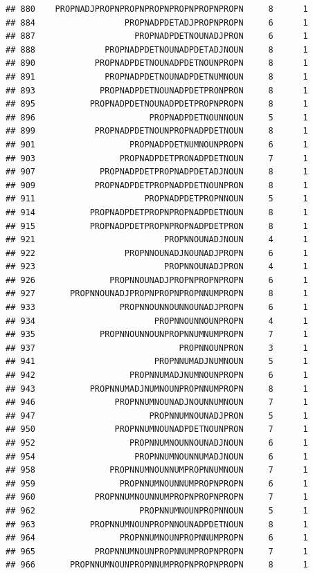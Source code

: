 \documentclass[]{article}
\begin{document}
\begin{verbatim}
## 880    PROPNADJPROPNPROPNPROPNPROPNPROPNPROPN     8      1
## 884                  PROPNADPDETADJPROPNPROPN     6      1
## 887                    PROPNADPDETNOUNADJPRON     6      1
## 888              PROPNADPDETNOUNADPDETADJNOUN     8      1
## 890            PROPNADPDETNOUNADPDETNOUNPROPN     8      1
## 891              PROPNADPDETNOUNADPDETNUMNOUN     8      1
## 893             PROPNADPDETNOUNADPDETPRONPRON     8      1
## 895           PROPNADPDETNOUNADPDETPROPNPROPN     8      1
## 896                       PROPNADPDETNOUNNOUN     5      1
## 899            PROPNADPDETNOUNPROPNADPDETNOUN     8      1
## 901                   PROPNADPDETNUMNOUNPROPN     6      1
## 903                 PROPNADPDETPRONADPDETNOUN     7      1
## 907             PROPNADPDETPROPNADPDETADJNOUN     8      1
## 909            PROPNADPDETPROPNADPDETNOUNPRON     8      1
## 911                      PROPNADPDETPROPNNOUN     5      1
## 914           PROPNADPDETPROPNPROPNADPDETNOUN     8      1
## 915           PROPNADPDETPROPNPROPNADPDETPRON     8      1
## 921                          PROPNNOUNADJNOUN     4      1
## 922                  PROPNNOUNADJNOUNADJPROPN     6      1
## 923                          PROPNNOUNADJPRON     4      1
## 926               PROPNNOUNADJPROPNPROPNPROPN     6      1
## 927       PROPNNOUNADJPROPNPROPNPROPNNUMPROPN     8      1
## 933                 PROPNNOUNNOUNNOUNADJPROPN     6      1
## 934                        PROPNNOUNNOUNPROPN     4      1
## 935             PROPNNOUNNOUNPROPNNUMNUMPROPN     7      1
## 937                             PROPNNOUNPRON     3      1
## 941                        PROPNNUMADJNUMNOUN     5      1
## 942                   PROPNNUMADJNUMNOUNPROPN     6      1
## 943           PROPNNUMADJNUMNOUNPROPNNUMPROPN     8      1
## 946                PROPNNUMNOUNADJNOUNNUMNOUN     7      1
## 947                       PROPNNUMNOUNADJPRON     5      1
## 950                PROPNNUMNOUNADPDETNOUNPRON     7      1
## 952                   PROPNNUMNOUNNOUNADJNOUN     6      1
## 954                    PROPNNUMNOUNNUMADJNOUN     6      1
## 958               PROPNNUMNOUNNUMPROPNNUMNOUN     7      1
## 959                 PROPNNUMNOUNNUMPROPNPROPN     6      1
## 960            PROPNNUMNOUNNUMPROPNPROPNPROPN     7      1
## 962                     PROPNNUMNOUNPROPNNOUN     5      1
## 963           PROPNNUMNOUNPROPNNOUNADPDETNOUN     8      1
## 964                 PROPNNUMNOUNPROPNNUMPROPN     6      1
## 965            PROPNNUMNOUNPROPNNUMPROPNPROPN     7      1
## 966       PROPNNUMNOUNPROPNNUMPROPNPROPNPROPN     8      1

\end{verbatim}
\end{document}
